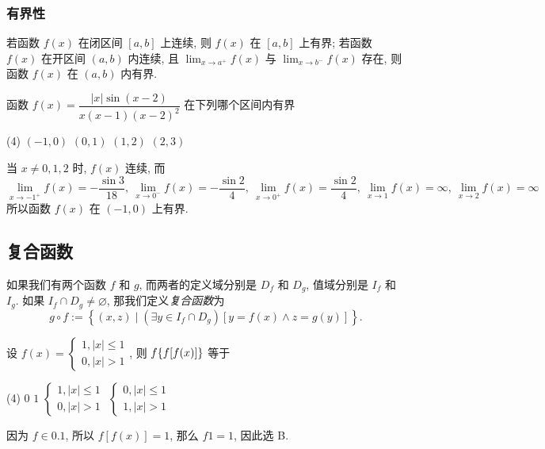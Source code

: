 \subsubsection{有界性}

\begin{theorem}[函数的有界性定理]
    若函数 $f(x)$ 在闭区间 $[a,b]$ 上连续, 则 $f(x)$ 在 $[a,b]$ 上有界;
    若函数 $f(x)$ 在开区间 $(a,b)$ 内连续, 且 $\displaystyle\lim_{x\to a^+}f(x)$ 与 $\displaystyle\lim_{x\to b^-}f(x)$ 存在, 则函数 $f(x)$ 在 $(a,b)$ 内有界.
\end{theorem}

\begin{example}[2004 数三]
    函数 $f(x)=\dfrac{|x|\sin(x-2)}{x(x-1)(x-2)^2}$ 在下列哪个区间内有界
    \begin{tasks}(4)
        \task $(-1,0)$
        \task $(0,1)$
        \task $(1,2)$
        \task $(2,3)$
    \end{tasks}
\end{example}
\begin{solution}
    当 $x\neq0,1,2$ 时, $f(x)$ 连续, 而
    $$\lim_{x\to-1^+}f(x)=-\dfrac{\sin 3}{18},~\lim_{x\to0^-}f(x)=-\dfrac{\sin 2}{4},~\lim_{x\to0^+}f(x)=\dfrac{\sin 2}{4},~\lim_{x\to1}f(x)=\infty,~\lim_{x\to2}f(x)=\infty$$
    所以函数 $f(x)$ 在 $(-1,0)$ 上有界.
\end{solution}

\subsection{复合函数}

\begin{definition}[复合函数]
    如果我们有两个函数 $ f $ 和 $ g $, 而两者的定义域分别是 $ D_{f} $ 和 $ D_{g} $, 
    值域分别是 $ I_{f} $ 和 $ I_{g} $. 如果 $ I_{f} \cap D_{g} \neq \varnothing $, 
    那我们定义\textit{复合函数}为 $$ g \circ f:=\left\{(x, z) \mid\left(\exists y \in I_{f} \cap D_{g}\right)[y=f(x) \wedge z=g(y)]\right\} .$$
\end{definition}

\begin{example}[2001 数二]
    设 $f(x)=\begin{cases}
            1,|x|\leqslant 1 \\0,|x|>1
        \end{cases}$, 则 $f\qty{f[f(x)]}$ 等于
    \begin{tasks}(4)
        \task $0$
        \task $1$
        \task $\begin{cases}
                1,|x|\leqslant 1 \\0,|x|>1
            \end{cases}$
        \task $\begin{cases}
                0,|x|\leqslant 1 \\1,|x|>1
            \end{cases}$
    \end{tasks}
\end{example}
\begin{solution}
    因为 $f\in\qty{0,1}$, 所以 $f[f(x)]=1$, 那么 $f\qty{1}=1$, 因此选 B.
\end{solution}

